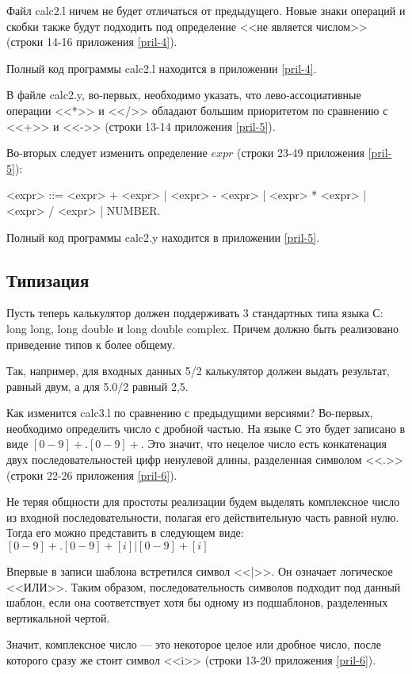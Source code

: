 \documentclass[bachelor, och, coursework, times]{SCWorks}
\begin{document}
Файл calc2.l ничем не будет отличаться от предыдущего. Новые знаки операций и скобки также будут подходить под определение <<не является числом>> (строки 14-16 приложения \ref{pril-4}).

Полный код программы calc2.l находится в приложении \ref{pril-4}.

В файле calc2.y, во-первых, необходимо указать, что лево-ассоциативные операции <<*>> и <</>> обладают большим приоритетом по сравнению с <<+>> и <<->> (строки 13-14 приложения \ref{pril-5}).

Во-вторых следует изменить определение $expr$ (строки 23-49 приложения \ref{pril-5}): 

<expr> ::= <expr> + <expr> | <expr> - <expr> | <expr> * <expr> | <expr> / <expr> | NUMBER.

Полный код программы calc2.y находится в приложении \ref{pril-5}.

\subsection{Типизация}
Пусть теперь калькулятор должен поддерживать 3 стандартных типа языка С: long long, long double и long double complex. Причем должно быть реализовано приведение типов к более общему.

Так, например, для входных данных 5/2 калькулятор должен выдать результат, равный двум, а для 5.0/2 равный 2,5.

Как изменится calc3.l по сравнению с предыдущими версиями?
Во-первых, необходимо определить число с дробной частью. На языке С это будет записано в виде $[0-9]+.[0-9]+$. Это значит, что нецелое число есть конкатенация двух последовательностей цифр ненулевой длины, разделенная символом <<.>>(строки 22-26 приложения \ref{pril-6}).

Не теряя общности для простоты реализации будем выделять комплексное число из входной последовательности, полагая его действительную часть равной нулю.
Тогда его можно представить в следующем виде: \linebreak
$[0-9]+.[0-9]+[i] | [0-9]+[i]$

Впервые в записи шаблона встретился символ <<|>>. Он означает логическое <<ИЛИ>>. Таким образом, последовательность символов подходит под данный шаблон, если она соответствует хотя бы одному из подшаблонов, разделенных вертикальной чертой.

Значит, комплексное число --- это некоторое целое или дробное число, после которого сразу же стоит символ <<i>> (строки 13-20 приложения  \ref{pril-6}).
\end{document}
